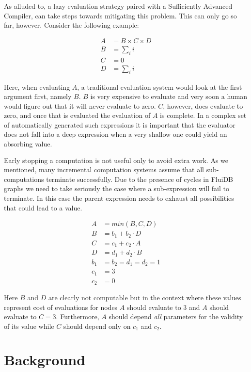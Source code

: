 As alluded to, a lazy evaluation strategy paired with a Sufficiently
Advanced Compiler, can take steps towards mitigating this
problem. This can only go so far, however. Consider the following
example:

\begin{align*}
A &= B \times C \times D \\
B &= \sum_i{i} \\
C &= 0 \\
D &= \sum_i{i}
\end{align*}

Here, when evaluating \(A\), a traditional evaluation system would
look at the first argument first, namely \(B\). \(B\) is very
expensive to evaluate and very soon a human would figure out that it
will never evaluate to zero. \(C\), however, does evaluate to zero,
and once that is evaluated the evaluation of \(A\) is complete. In a
complex set of automatically generated such expressions it is
important that the evaluator does not fall into a deep expression when
a very shallow one could yield an absorbing value.

Early stopping a computation is not useful only to avoid extra
work. As we mentioned, many incremental computation systems assume
that all sub-computations terminate successfully. Due to the presence
of cycles in FluiDB graphs we need to take seriously the case where a
sub-expression will fail to terminate. In this case the parent
expression needs to exhaust all possibilities that could lead to a
value.

\begin{align*}
A &= min(B, C, D) \\
B &= b_1 + b_2 \cdot D \\
C &= c_1 + c_2 \cdot A \\
D &= d_1 + d_2 \cdot B \\
b_1 &= b_2 = d_1 = d_2 = 1 \\
c_1 &= 3 \\
c_2 &= 0
\end{align*}

Here \(B\) and \(D\) are clearly not computable but in the context
where these values represent cost of evaluations for nodes \(A\)
should evaluate to 3 and \(A\) should evaluate to \(C =
3\). Furthermore, \(A\) should depend \emph{all} parameters for the
validity of its value while \(C\) should depend only on \(c_1\) and
\(c_2\).


\section{Background}

